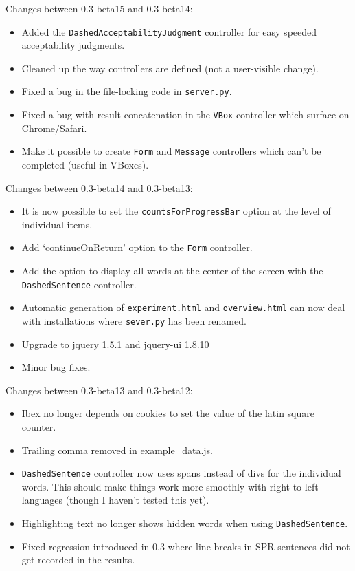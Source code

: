 \documentclass[11pt,letterpaper]{article}
\begin{document}
Changes between 0.3-beta15 and 0.3-beta14:
\begin{itemize}

\item
 Added the \texttt{DashedAcceptabilityJudgment} controller for easy speeded acceptability judgments.
\item
 Cleaned up the way controllers are defined (not a user-visible change).
\item
 Fixed a bug in the file-locking code in \texttt{server.py}.
\item
 Fixed a bug with result concatenation in the \texttt{VBox} controller which surface on Chrome/Safari.
\item
 Make it possible to create \texttt{Form} and \texttt{Message} controllers which can't be completed (useful in VBoxes).
\end{itemize}
Changes between 0.3-beta14 and 0.3-beta13:
\begin{itemize}

\item
 It is now possible to set the \texttt{countsForProgressBar} option at the level of individual items.
\item
 Add `continueOnReturn' option to the \texttt{Form} controller.
\item
 Add the option to display all words at the center of the screen with the \texttt{DashedSentence} controller.
\item
 Automatic generation of \texttt{experiment.html} and \texttt{overview.html} can now deal with installations where \texttt{sever.py} has been renamed.
\item
 Upgrade to jquery 1.5.1 and jquery-ui 1.8.10
\item
 Minor bug fixes.
\end{itemize}
Changes between 0.3-beta13 and 0.3-beta12:
\begin{itemize}

\item
 Ibex no longer depends on cookies to set the value of the latin square counter.
\item
 Trailing comma removed in example\_data.js.
\item
 \texttt{DashedSentence} controller now uses spans instead of divs for the individual words. This should make things work more smoothly with right-to-left languages (though I haven't tested this yet).
\item
 Highlighting text no longer shows hidden words when using \texttt{DashedSentence}.
\item
 Fixed regression introduced in 0.3 where line breaks in SPR sentences did not get recorded in the results.
\end{itemize}
\end{document}
